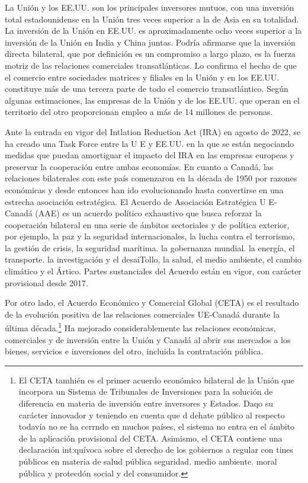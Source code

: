 \documentclass[10pt,a4paper]{article}
\begin{document}
La Unión y los EE.UU. son los principales inversores mutuos, con una inversión total estadounidense en la Unión tres veces superior a la de Asia en su totalidad. La inversión de la Unión en EE.UU. es aproximadamente ocho veces superior a la inversión de la Unión en India y China juntas. Podría afirmarse que la inversión directa bilateral, que por definición es un compromiso a largo plazo, es la fuerza motriz de las relaciones comerciales transatlánticas. Lo confirma el hecho de que el comercio entre sociedades matrices y filiales en la Unión y en los EE.UU. constituye más de una tercera parte de todo el comercio transatlántico. Según algunas estimaciones, las empresas de la Unión y de los EE.UU. que operan en el territorio del otro proporcionan empleo a más de 14 millones de personas.

Ante la entrada en vigor del Intlation Reduction Act (IRA) en agosto de 2022, se ha creado una Task Force entre la U E y EE.UU. en la que se están negociando medidas que puedan amortiguar el impacto del IRA en las empresas europeas y preservar la cooperación entre ambas economías. En cuanto a Canadá, las relaciones bilaterales con este país comenzaron en la década de 1950 por razones económicas y desde entonces han ido evolucionando hasta convertirse en una estrecha asociación estratégica. El Acuerdo de Asociación Estratégica U E-Canadá (AAE) es un acuerdo político exhaustivo que busca reforzar la cooperación bilateral en una serie de ámbitos sectoriales y de política exterior, por ejemplo, la paz y la seguridad internacionales, la lucha contra el terrorismo, la gestión de crisis, la seguridad marítima. la gobernanza mundial. la energía, el transporte. la investigación y el desaiTollo, la salud, el medio ambiente, el cambio climático y el Ártico. Partes sustanciales del Acuerdo están en vigor, con carácter provisional desde 2017.

Por otro lado, el Acuerdo Económico y Comercial Global (CETA) es el resultado de la evolución positiva de las relaciones comerciales UE-Canadá durante la última década.\footnote{%
    El CETA tamhién es el primer acuerdo económico bilateral de la Unión que incorpora un Sistema de Tribunales de Inversiones para la solución de diferencia en materia de inversión entre inversores y Estados. Daqo su carácter innovador y teniendo en cuenta que d dehate público al respecto todavía no se ha ccrrndo en muchos países, el sistema no entra en el ámbito de la aplicación provisional del CETA. Asimismo, el CETA contiene una declaración int:quívoca sobre el derecho de los gobiernos a regular con tines públicos en materia de salud pública seguridad. medio ambiente. moral pública y protecdón social y del consumidor.
} Ha mejorado considerablemente las relaciones económicas, comerciales y de inversión entre la Unión y Canadá al abrir sus mercados a los bienes, servicios e inversiones del otro, incluida la contratación pública.
\end{document}
